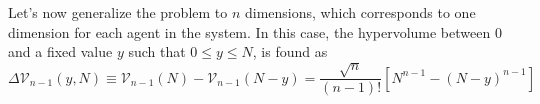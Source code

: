 Let's now generalize the problem to $n$ dimensions, which corresponds to one dimension for each agent in the system.
In this case, the hypervolume between 0 and a fixed value $y$ such that $0 \leq y \leq N$, is found as
\begin{equation*}
    \Delta\mathcal{V}_{n-1}\left(y, N\right) \equiv \mathcal{V}_{n-1}\left(N\right) - \mathcal{V}_{n-1}\left(N-y\right) = \frac{\sqrt{n}}{\left(n-1\right)!}\left[N^{n-1} - \left(N - y\right)^{n-1}\right]
\end{equation*}


        


